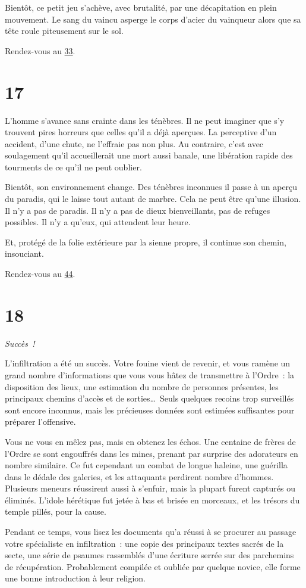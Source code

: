 \documentclass{report}
\newcommand{\gsection}[1]{
    \section{#1}
    \label{section-#1}
}
\newcommand{\glink}[1]{\hyperref[section-#1]{#1}}
\newcommand{\success}{\emph{Succès !}}
\begin{document}
Bientôt, ce petit jeu s'achève, avec brutalité, par une décapitation en plein mouvement. Le sang du vaincu asperge le corps d'acier du vainqueur alors que sa tête roule piteusement sur le sol.

Rendez-vous au \glink{33}.

\gsection{17}

L'homme s'avance sans crainte dans les ténèbres. Il ne peut imaginer que s'y trouvent pires horreurs que celles qu'il a déjà aperçues. La perceptive d'un accident, d'une chute, ne l'effraie pas non plus. Au contraire, c'est avec soulagement qu'il accueillerait une mort aussi banale, une libération rapide des tourments de ce qu'il ne peut oublier.

Bientôt, son environnement change. Des ténèbres inconnues il passe à un aperçu du paradis, qui le laisse tout autant de marbre. Cela ne peut être qu'une illusion. Il n'y a pas de paradis. Il n'y a pas de dieux bienveillants, pas de refuges possibles. Il n'y a qu'eux, qui attendent leur heure.

Et, protégé de la folie extérieure par la sienne propre, il continue son chemin, insouciant.

Rendez-vous au \glink{44}.

\gsection{18}

\success

L'infiltration a été un succès. Votre fouine vient de revenir, et vous ramène un grand nombre d'informations que vous vous hâtez de transmettre à l'Ordre : la disposition des lieux, une estimation du nombre de personnes présentes, les principaux chemins d'accès et de sorties\dots~Seuls quelques recoins trop surveillés sont encore inconnus, mais les précieuses données sont estimées suffisantes pour préparer l'offensive.

Vous ne vous en mêlez pas, mais en obtenez les échos. Une centaine de frères de l'Ordre se sont engouffrés dans les mines, prenant par surprise des adorateurs en nombre similaire. Ce fut cependant un combat de longue haleine, une guérilla dans le dédale des galeries, et les attaquants perdirent nombre d'hommes. Plusieurs meneurs réussirent aussi à s'enfuir, mais la plupart furent capturés ou éliminés. L'idole hérétique fut jetée à bas et brisée en morceaux, et les trésors du temple pillés, pour la cause.

Pendant ce temps, vous lisez les documents qu'a réussi à se procurer au passage votre spécialiste en infiltration : une copie des principaux textes sacrés de la secte, une série de psaumes rassemblés d'une écriture serrée sur des parchemins de récupération. Probablement compilée et oubliée par quelque novice, elle forme une bonne introduction à leur religion.
\end{document}
